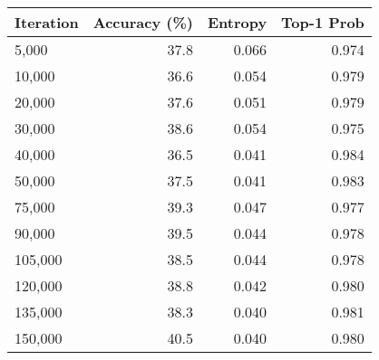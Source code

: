 \begin{tabular}{lrrr}
\toprule
Iteration & Accuracy (\%) & Entropy & Top-1 Prob \\
\midrule
    5,000 &          37.8 &   0.066 &      0.974 \\
   10,000 &          36.6 &   0.054 &      0.979 \\
   20,000 &          37.6 &   0.051 &      0.979 \\
   30,000 &          38.6 &   0.054 &      0.975 \\
   40,000 &          36.5 &   0.041 &      0.984 \\
   50,000 &          37.5 &   0.041 &      0.983 \\
   75,000 &          39.3 &   0.047 &      0.977 \\
   90,000 &          39.5 &   0.044 &      0.978 \\
  105,000 &          38.5 &   0.044 &      0.978 \\
  120,000 &          38.8 &   0.042 &      0.980 \\
  135,000 &          38.3 &   0.040 &      0.981 \\
  150,000 &          40.5 &   0.040 &      0.980 \\
\bottomrule
\end{tabular}
